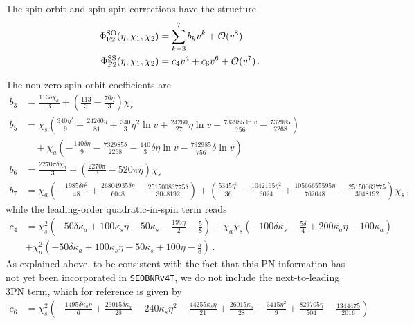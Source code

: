 \documentclass[prd,aps,letter,twocolumn,floatfix,notitlepage,nofootinbib]{revtex4-1}
\begin{document}
The spin-orbit and spin-spin corrections have the structure
\begin{align}
	\Phi_{\rm F2}^{\rm SO}(\eta, \chi_{1}, \chi_{2}) &= \sum_{k=3}^{7} b_{k} v^{k} + \mathcal{O}(v^{8})\nonumber\\
	\Phi_{\rm F2}^{\rm SS}(\eta, \chi_{1}, \chi_{2}) &= c_{4} v^{4} + c_{6} v^{6} + \mathcal{O}(v^{7}) \,.
\end{align}
\begin{widetext}
The non-zero spin-orbit coefficients are
\begin{align}
	b_{3} &= \frac{113 \delta   \chi_a }{3}+\left(\frac{113}{3}-\frac{76 \eta }{3}\right)  \chi_s \nonumber\\
	b_{5} &=  \chi_s  \left(\frac{340 \eta ^2}{9}+\frac{24260 \eta }{81}+\frac{340}{3} \eta ^2  \ln v +\frac{24260}{27} \eta   \ln v -\frac{732985  \ln v }{756}-\frac{732985}{2268}\right) \nonumber\\
	& \quad + \chi_a  \left(-\frac{140 \delta  \eta }{9}-\frac{732985 \delta }{2268}-\frac{140}{3} \delta  \eta   \ln v -\frac{732985}{756} \delta   \ln v \right)  \nonumber\\
	b_{6} &= \frac{2270 \pi  \delta   \chi_a }{3}+\left(\frac{2270 \pi }{3}-520 \pi  \eta \right)  \chi_s \nonumber\\
	b_{7} &=  \chi_a  \left(-\frac{1985 \delta  \eta ^2}{48}+\frac{26804935 \delta  \eta }{6048}-\frac{25150083775 \delta }{3048192}\right)+\left(\frac{5345 \eta ^3}{36}-\frac{1042165 \eta ^2}{3024}+\frac{10566655595 \eta }{762048}-\frac{25150083775}{3048192}\right)  \chi_s \,,
\end{align}
while the leading-order quadratic-in-spin term reads
\begin{align}
	c_{4} &= \chi_s ^2 \left(-50 \delta   \kappa_a +100  \kappa_s  \eta -50  \kappa_s -\frac{195 \eta }{2}-\frac{5}{8}\right) + \chi_a   \chi_s  \left(-100 \delta   \kappa_s -\frac{5 \delta }{4}+200  \kappa_a  \eta -100  \kappa_a \right) \nonumber\\
	& + \chi_a ^2 \left(-50 \delta   \kappa_a +100  \kappa_s  \eta -50  \kappa_s +100 \eta -\frac{5}{8}\right) \,.
\end{align}
As explained above, to be consistent with the fact that this PN information has not yet been incorporated in \texttt{SEOBNRv4T}, we do not include the next-to-leading 3PN term, which for reference is given by~\cite{Bohe:2015ana}
\begin{align}
	c_{6} &=  \chi_s ^2 \left(-\frac{1495 \delta   \kappa_a  \eta }{6}+\frac{26015 \delta   \kappa_a }{28}-240  \kappa_s  \eta ^2-\frac{44255  \kappa_s  \eta }{21}+\frac{26015  \kappa_s }{28}+\frac{3415 \eta ^2}{9}+\frac{829705 \eta }{504}-\frac{1344475}{2016}\right) \nonumber\\

\end{align}
\end{widetext}
\end{document}
